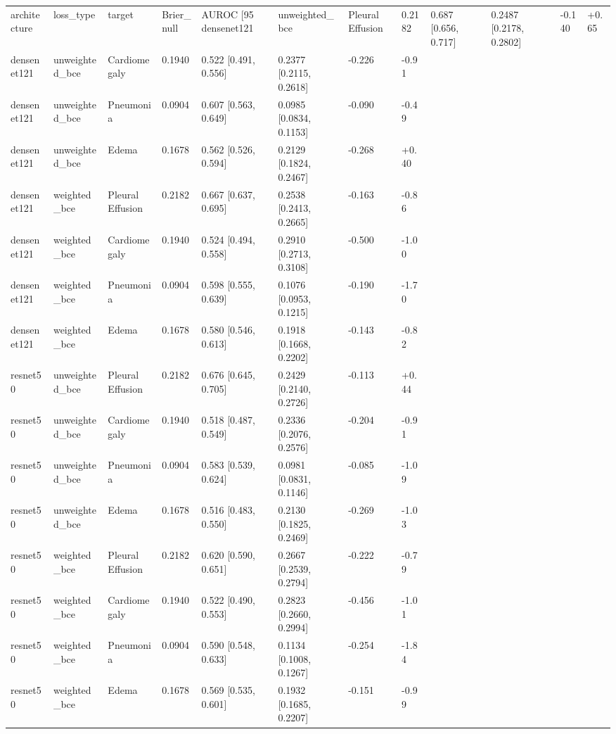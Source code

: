 \begin{tabular}{llllllll}
\toprule
architecture & loss_type & target & Brier_null & AUROC [95%
\midrule
densenet121 & unweighted_bce & Pleural Effusion & 0.2182 & 0.687 [0.656, 0.717] & 0.2487 [0.2178, 0.2802] & -0.140 & +0.65 \\
densenet121 & unweighted_bce & Cardiomegaly & 0.1940 & 0.522 [0.491, 0.556] & 0.2377 [0.2115, 0.2618] & -0.226 & -0.91 \\
densenet121 & unweighted_bce & Pneumonia & 0.0904 & 0.607 [0.563, 0.649] & 0.0985 [0.0834, 0.1153] & -0.090 & -0.49 \\
densenet121 & unweighted_bce & Edema & 0.1678 & 0.562 [0.526, 0.594] & 0.2129 [0.1824, 0.2467] & -0.268 & +0.40 \\
densenet121 & weighted_bce & Pleural Effusion & 0.2182 & 0.667 [0.637, 0.695] & 0.2538 [0.2413, 0.2665] & -0.163 & -0.86 \\
densenet121 & weighted_bce & Cardiomegaly & 0.1940 & 0.524 [0.494, 0.558] & 0.2910 [0.2713, 0.3108] & -0.500 & -1.00 \\
densenet121 & weighted_bce & Pneumonia & 0.0904 & 0.598 [0.555, 0.639] & 0.1076 [0.0953, 0.1215] & -0.190 & -1.70 \\
densenet121 & weighted_bce & Edema & 0.1678 & 0.580 [0.546, 0.613] & 0.1918 [0.1668, 0.2202] & -0.143 & -0.82 \\
resnet50 & unweighted_bce & Pleural Effusion & 0.2182 & 0.676 [0.645, 0.705] & 0.2429 [0.2140, 0.2726] & -0.113 & +0.44 \\
resnet50 & unweighted_bce & Cardiomegaly & 0.1940 & 0.518 [0.487, 0.549] & 0.2336 [0.2076, 0.2576] & -0.204 & -0.91 \\
resnet50 & unweighted_bce & Pneumonia & 0.0904 & 0.583 [0.539, 0.624] & 0.0981 [0.0831, 0.1146] & -0.085 & -1.09 \\
resnet50 & unweighted_bce & Edema & 0.1678 & 0.516 [0.483, 0.550] & 0.2130 [0.1825, 0.2469] & -0.269 & -1.03 \\
resnet50 & weighted_bce & Pleural Effusion & 0.2182 & 0.620 [0.590, 0.651] & 0.2667 [0.2539, 0.2794] & -0.222 & -0.79 \\
resnet50 & weighted_bce & Cardiomegaly & 0.1940 & 0.522 [0.490, 0.553] & 0.2823 [0.2660, 0.2994] & -0.456 & -1.01 \\
resnet50 & weighted_bce & Pneumonia & 0.0904 & 0.590 [0.548, 0.633] & 0.1134 [0.1008, 0.1267] & -0.254 & -1.84 \\
resnet50 & weighted_bce & Edema & 0.1678 & 0.569 [0.535, 0.601] & 0.1932 [0.1685, 0.2207] & -0.151 & -0.99 \\
\bottomrule
\end{tabular}
